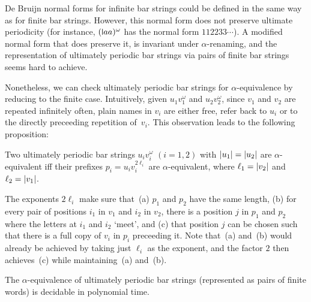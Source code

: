 \documentclass[a4paper,UKenglish,cleveref,autoref,thm-restate,numberwithinsect,final]{lipics-v2021}
\begin{document}
       De Bruijn normal forms for infinite bar strings could be defined in the same way as for finite bar strings. However, this normal form does not preserve ultimate periodicity (for instance, $(\newletter aa)^\omega$ has the normal form $11 22 33\cdots$). A modified normal form that does preserve it, is invariant under $\alpha$-renaming, and the representation of ultimately periodic bar strings via pairs of finite bar strings seems hard to achieve.

Nonetheless, we can check ultimately periodic bar strings for $\alpha$-equivalence by reducing to the finite case. Intuitively, given $u_1v_1^\omega$ and $u_2v_2^\omega$, since $v_1$ and $v_2$ are repeated
    infinitely often, plain names in $v_i$ are either free,
    refer back to $u_i$ or to the directly preceeding repetition of~$v_i$. This observation leads to the
    following proposition:
    \begin{proposition}\label{lem:aeinfbar}
      Two ultimately periodic bar strings $u_iv_i^\omega$ $(i=1,2)$ with $\abs{u_1} = \abs{u_2}$ are
      $\alpha$-equivalent iff their prefixes $p_i = u_i v_i^{2\ell_i}$ are $\alpha$-equivalent, where
      $\ell_1 = \abs{v_2}$ and $\ell_2 = \abs{v_1}$.
    \end{proposition}
      \noindent
      The exponents $2\ell_i$ make sure that~(a) $p_1$ and $p_2$ have the same length, (b) for every pair of positions $i_1$ in $v_1$ and $i_2$ in $v_2$, there is a position $j$ in $p_1$ and $p_2$ where the letters at $i_1$ and $i_2$ `meet', and (c) that position $j$ can be chosen such that there is a full copy of $v_i$ in $p_i$ preceeding it. Note that~(a) and~(b) would already be achieved by taking just $\ell_i$ as the exponent, and the factor $2$ then achieves~(c) while maintaining~(a) and~(b).

\begin{corollary}
The $\alpha$-equivalence of ultimately periodic bar strings (represented as pairs of finite words) is decidable in polynomial time.
\end{corollary}
\end{document}
